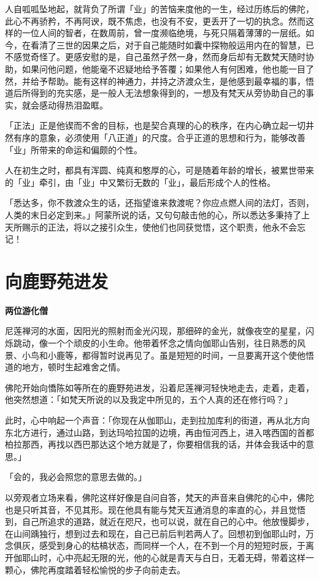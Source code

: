 \documentclass[twoside,openany]{book}
\newcommand{\mt}[1]{\textbullet \textbf{#1}}
\begin{document}
人自呱呱坠地起，就背负了所谓「业」的苦恼来度他的一生，经过历练后的佛陀，此心不再骄矜，不再阿谀，既不焦虑，也没有不安，更丢开了一切的执念。然而这样的一位人间的智者，在数周前，曾一度濒临绝境，与死只隔着薄薄的一层纸。如今，在看清了三世的因果之后，对于自己能随时如囊中探物般运用内在的智慧，已不感觉奇怪了。更感安慰的是，自己虽然孑然一身，然而身后却有无数梵天随时协助，如果问他问题，他能毫不迟疑地给予答覆；如果他人有何困难，他也能一目了然，并给予帮助。能有这样的神通力，并持之济渡众生，是他感到最幸福的事，悟道后所得到的充实感，是一般人无法想象得到的，一想及有梵天从旁协助自己的事实，就会感动得热泪盈眶。

「正法」正是他锲而不舍的目标，也是契合真理的心的秩序，在内心确立起一切井然有序的意象，必须使用「八正道」的尺度。合乎正道的思想和行为，能够改善「业」所带来的命运和偏颇的个性。

人在初生之时，都具有浑圆、纯真和憨厚的心，可是随着年龄的增长，被累世带来的「业」牵引，由「业」中又繁衍无数的「业」，最后形成个人的性格。

「悉达多，你不救渡众生的话，还指望谁来救渡呢？你应点燃人间的法灯，否则，人类的末日必定到来。」阿蒙所说的话，又句句敲击他的心，所以悉达多秉持了上天所赐示的正法，将以之接引众生，使他们也同获觉悟，这个职责，他永不会忘记！

\section{向鹿野苑进发}\label{sec2.2}

\mt{两位游化僧}

尼莲禅河的水面，因阳光的照射而金光闪现，那细碎的金光，就像夜空的星星，闪烁跳动，像一个个顽皮的小生命。他带着怀念之情向伽耶山告别，往日熟悉的风景、小鸟和小鹿等，都得暂时说再见了。虽是短短的时间，一旦要离开这个使他悟道的地方，顿时生起难舍之情。

佛陀开始向憍陈如等所在的鹿野苑进发，沿着尼莲禅河轻快地走去，走着，走着，他突然想道：「如梵天所说的以及我定中所见的，五个人真的还在修行吗？」

此时，心中响起一个声音：「你现在从伽耶山，走到拉加库利的街道，再从北方向东北方进行，通过山路，到达玛哈拉国的边境，再由恒河西上，进入喀西国的首都柏拉那西，再找以西巴那达这个地方就是了，你要相信我的话，并体会我话中的意思。」

「会的，我必会照您的意思去做的。」

以旁观者立场来看，佛陀这样好像是自问自答，梵天的声音来自佛陀的心中，佛陀也是只听其音，不见其形。现在他具有能与梵天互通消息的率直的心，并且觉悟到，自己所追求的道路，就近在咫尺，也可以说，就在自己的心中。他放慢脚步，在山间踽独行，想到过去和现在，自己已前后判若两人了。回想初到伽耶山时，万念俱灰，感受到身心的枯槁状态，而同样一个人，在不到一个月的短短时辰，于离开伽耶山时，心中亮起无限的光，他的心就是青天与白日，无着无碍，带着这样一颗心，佛陀再度踏着轻松愉悦的步子向前走去。
\end{document}
